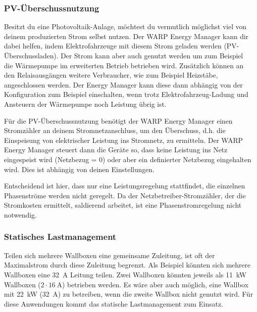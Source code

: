 \documentclass[a4paper,10pt]{article}
\begin{document}
\begin{multicols*}{2}
	\subsubsection{PV-Überschussnutzung}
	\label{pv_ueberschussnutzung}

	Besitzt du eine Photovoltaik-Anlage, möchtest du vermutlich möglichst viel
	von deinem produzierten Strom selbst nutzen. Der WARP Energy Manager kann
	dir dabei helfen, indem Elektrofahrzeuge mit diesem Strom geladen werden (PV-Überschussladen).
    Der Strom kann aber auch genutzt werden um zum Beispiel die Wärmepumpe im erweiterten Betrieb 
    betrieben wird. Zusätzlich können an den Relaisausgängen weitere Verbraucher, wie zum Beispiel Heizstäbe,
    angeschlossen werden. Der Energy Manager kann diese dann abhängig von der Konfiguration zum Beispiel einschalten, wenn trotz 
    Elektrofahrzeug-Ladung und Ansteuern der Wärmepumpe noch Leistung übrig ist.

	Für die PV-Überschussnutzung benötigt der WARP Energy Manager einen Stromzähler
	an deinem Stromnetzanschluss, um den Überschuss, d.h. die Einspeisung von
	elektrischer Leistung ins Stromnetz, zu ermitteln. Der WARP Energy Manager
	steuert dann die Geräte so, dass keine Leistung ins Netz eingespeist wird
	(Netzbezug = 0) oder aber ein definierter Netzbezug eingehalten wird. Dies
	ist abhängig von deinen Einstellungen.

	Entscheidend ist hier, dass nur eine Leistungsregelung stattfindet, die einzelnen Phasenströme werden nicht geregelt. Da der Netzbetreiber-Stromzähler,
	der die Stromkosten ermittelt, saldierend arbeitet, ist eine Phasenstromregelung nicht notwendig.

	\vspace{-0.05cm}
	\subsubsection{Statisches Lastmanagement}
	\label{statisches_lastmanagement}

	Teilen sich mehrere Wallboxen eine gemeinsame Zuleitung, ist oft der
	Maximalstrom durch diese Zuleitung begrenzt. Als Beispiel könnten sich mehrere
	Wallboxen eine \SI{32}{\ampere} Leitung teilen. Zwei Wallboxen könnten jeweils als \SI{11}{\kilo\watt}
	Wallboxen ($2\cdot\SI{16}{\ampere}$) betrieben werden. Es wäre aber auch möglich, eine
	Wallbox mit \SI{22}{\kilo\watt} (\SI{32}{\ampere}) zu betreiben, wenn die zweite Wallbox nicht genutzt
	wird. Für diese Anwendungen kommt das statische Lastmanagement zum Einsatz.


\end{multicols*}
\end{document}
